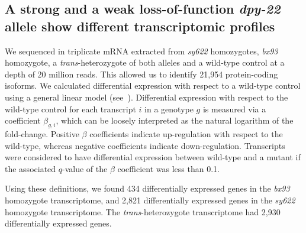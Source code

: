 \documentclass[10pt, twocolumn]{article}
\newcommand{\gene}[1]{\mbox{\emph{#1}}}
\newcommand{\dpy}{\gene{dpy-22} (\emph{MED-12})}
\newcommand{\strongn}{2,821}
\newcommand{\weakn}{434}
\newcommand{\transn}{2,930}
\begin{document}
\subsection*{A strong and a weak loss-of-function \gene{dpy-22} allele show
             different transcriptomic profiles}

We sequenced in triplicate mRNA extracted from \emph{sy622} homozygotes,
\emph{bx93} homozygote, a
\emph{trans}-heterozygote of both alleles and a wild-type control at a depth of
20 million reads. This allowed us to identify 21,954 protein-coding isoforms. We
calculated differential expression with respect to a wild-type control using a
general linear model (see~). Differential expression with
respect to the wild-type control for each transcript $i$ in a genotype $g$ is
measured via a coefficient $\beta_{g, i}$, which can be loosely interpreted as
the natural logarithm of the fold-change. Positive $\beta$ coefficients indicate
up-regulation with respect to the wild-type, whereas negative coefficients
indicate down-regulation. Transcripts were considered to have differential
expression between wild-type and a mutant if the associated $q$-value of the
$\beta$ coefficient was less than 0.1.

Using these definitions, we found \weakn{} differentially expressed
genes in the  \emph{bx93} homozygote transcriptome, and \strongn{}
differentially expressed genes in the \emph{sy622} homozygote transcriptome. The
\emph{trans}-heterozygote transcriptome had \transn{} differentially expressed
genes.
\end{document}
